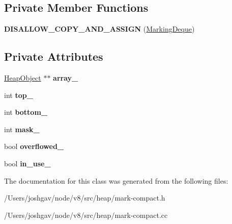 \subsection*{Private Member Functions}
\begin{DoxyCompactItemize}
\item 
{\bfseries D\+I\+S\+A\+L\+L\+O\+W\+\_\+\+C\+O\+P\+Y\+\_\+\+A\+N\+D\+\_\+\+A\+S\+S\+I\+GN} (\hyperlink{classv8_1_1internal_1_1_marking_deque}{Marking\+Deque})\hypertarget{classv8_1_1internal_1_1_marking_deque_aeeb3890b5be8d9b986313025df4748a6}{}\label{classv8_1_1internal_1_1_marking_deque_aeeb3890b5be8d9b986313025df4748a6}

\end{DoxyCompactItemize}
\subsection*{Private Attributes}
\begin{DoxyCompactItemize}
\item 
\hyperlink{classv8_1_1internal_1_1_heap_object}{Heap\+Object} $\ast$$\ast$ {\bfseries array\+\_\+}\hypertarget{classv8_1_1internal_1_1_marking_deque_ae1e7fb359ae3a04068e3ac36159bb93f}{}\label{classv8_1_1internal_1_1_marking_deque_ae1e7fb359ae3a04068e3ac36159bb93f}

\item 
int {\bfseries top\+\_\+}\hypertarget{classv8_1_1internal_1_1_marking_deque_a22269c01d5470ee0041fd6403df3e93b}{}\label{classv8_1_1internal_1_1_marking_deque_a22269c01d5470ee0041fd6403df3e93b}

\item 
int {\bfseries bottom\+\_\+}\hypertarget{classv8_1_1internal_1_1_marking_deque_a05e42b748edcdff6c8b7a825845f2caa}{}\label{classv8_1_1internal_1_1_marking_deque_a05e42b748edcdff6c8b7a825845f2caa}

\item 
int {\bfseries mask\+\_\+}\hypertarget{classv8_1_1internal_1_1_marking_deque_a0dfd72c58269612fd10037a3f8621fd5}{}\label{classv8_1_1internal_1_1_marking_deque_a0dfd72c58269612fd10037a3f8621fd5}

\item 
bool {\bfseries overflowed\+\_\+}\hypertarget{classv8_1_1internal_1_1_marking_deque_a4836f54d16935a9531054a44a050bb33}{}\label{classv8_1_1internal_1_1_marking_deque_a4836f54d16935a9531054a44a050bb33}

\item 
bool {\bfseries in\+\_\+use\+\_\+}\hypertarget{classv8_1_1internal_1_1_marking_deque_acee9e8f043b118c110cd7b7465ba1c8e}{}\label{classv8_1_1internal_1_1_marking_deque_acee9e8f043b118c110cd7b7465ba1c8e}

\end{DoxyCompactItemize}


The documentation for this class was generated from the following files\+:\begin{DoxyCompactItemize}
\item 
/\+Users/joshgav/node/v8/src/heap/mark-\/compact.\+h\item 
/\+Users/joshgav/node/v8/src/heap/mark-\/compact.\+cc\end{DoxyCompactItemize}

